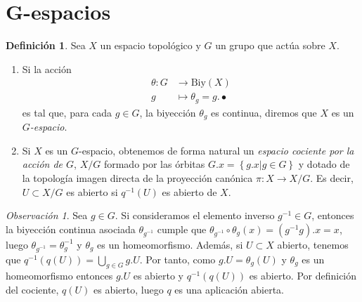 \documentclass[12pt,a4paper]{book}
\theoremstyle{definition} \newtheorem{defn}[thm]{Definición}
\theoremstyle{definition} \newtheorem{ejemplo}[thm]{Ejemplo}
\theoremstyle{definition} \newtheorem{ejercicio}[thm]{Ejercicio}
\theoremstyle{remark} \newtheorem*{obs}{Observación}
\begin{document}
\section{G-espacios}
\begin{defn}
  Sea $X$ un espacio topológico y $G$ un grupo que actúa sobre $X$.
  \begin{enumerate}
    \item Si la acción 
      \begin{align*}
	\theta :G&\longrightarrow \mathrm{Biy}(X)\\ 
	  g &\longmapsto \theta_g=g.\bullet 
	\end{align*}
  es tal que, para cada $g\in G$, la biyección $\theta_g$ es continua, diremos que $X$ es un \emph{$G$-espacio}.
\item Si $X$ es un $G$-espacio, obtenemos de forma natural un \emph{espacio cociente por la acción de $G$}, $X/G$ formado por las órbitas $G.x=\left\{ g.x|g\in G \right\}$ y dotado de la topología imagen directa de la proyección canónica $\pi:X\rightarrow X/G$. Es decir, $U\subset X/G$ es abierto si $q^{-1}(U)$ es abierto de $X$.
  \end{enumerate}
\end{defn}
\begin{obs}
  Sea $g\in G$. Si consideramos el elemento inverso $g^{-1}\in G$, entonces la biyección continua asociada $\theta_{g^{-1}}$ cumple que $\theta_{g^{-1}}\circ\theta_{g}(x)=(g^{-1}g).x=x$, luego $\theta_{g^{-1}}=\theta_g^{-1}$ y $\theta_g$ es un homeomorfismo. Además, si $U\subset X$ abierto, tenemos que $q^{-1}(q(U))=\bigcup_{g\in G}g.U$. Por tanto, como $g.U=\theta_g(U)$ y $\theta_g$ es un homeomorfismo entonces $g.U$ es abierto y $q^{-1}(q(U))$ es abierto. Por definición del cociente, $q(U)$ es abierto, luego $q$ es una aplicación abierta.
\end{obs}
\end{document}
